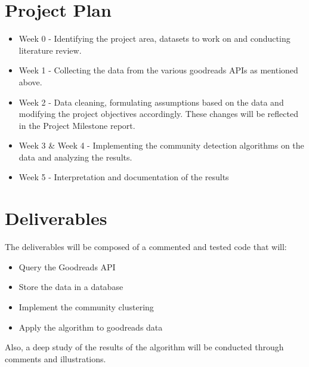 \documentclass[12pt]{article}
\begin{document}
\section{Project Plan}
\begin{itemize}
\item Week 0 - Identifying the project area, datasets to work on and conducting literature review.
\item Week 1 -  Collecting the data from the various goodreads APIs as mentioned above.
\item Week 2 -  Data cleaning, formulating assumptions based on the data and modifying the project objectives accordingly. These changes will be reflected in the Project Milestone report.
\item Week 3 \& Week 4 - Implementing the community detection algorithms on the data and analyzing the results.
\item Week 5 - Interpretation and documentation of the results
\end{itemize}
\section{Deliverables}

The deliverables will be composed of a commented and tested code that will:
\begin{itemize}
\item Query the Goodreads API
\item Store the data in a database
\item Implement the community clustering
\item Apply the algorithm to goodreads data
\end{itemize}

Also, a deep study of the results of the algorithm will be conducted through comments and illustrations.



\end{document}
